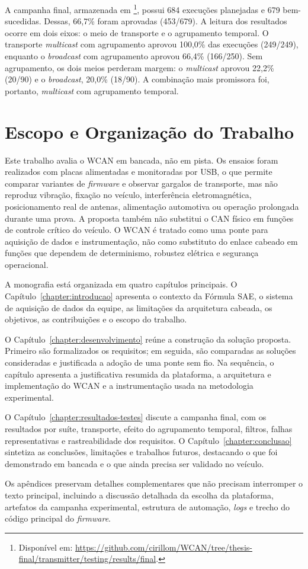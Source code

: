 A campanha final, armazenada em \footnote{Disponível em: \url{https://github.com/cirillom/WCAN/tree/thesis-final/transmitter/testing/results/final}.}, possui 684 execuções
planejadas e 679 bem-sucedidas. Dessas, 66,7\% foram aprovadas
(453/679). A leitura dos resultados ocorre em dois eixos: o meio de transporte
e o agrupamento temporal. O transporte \emph{multicast} com agrupamento aprovou 100,0\%
das execuções (249/249), enquanto o \emph{broadcast} com
agrupamento aprovou 66,4\% (166/250). Sem agrupamento, os dois meios perderam
margem: o \emph{multicast} aprovou 22,2\% (20/90) e o \emph{broadcast},
20,0\% (18/90). A combinação mais promissora foi, portanto, \emph{multicast}
com agrupamento temporal.

\section{Escopo e Organização do Trabalho}

Este trabalho avalia o WCAN em bancada, não em pista. Os ensaios foram realizados
com placas alimentadas e monitoradas por USB, o que permite comparar variantes de
\emph{firmware} e observar gargalos de transporte, mas não reproduz vibração, fixação no
veículo, interferência eletromagnética, posicionamento real de antenas,
alimentação automotiva ou operação prolongada durante uma prova. A proposta também
não substitui o CAN físico em funções de controle crítico do veículo. O WCAN é
tratado como uma ponte para aquisição de dados e instrumentação, não como
substituto do enlace cabeado em funções que dependem de determinismo, robustez
elétrica e segurança operacional.

A monografia está organizada em quatro capítulos principais. O
Capítulo~\ref{chapter:introducao} apresenta o contexto da Fórmula SAE, o sistema
de aquisição de dados da equipe, as limitações da arquitetura cabeada, os
objetivos, as contribuições e o escopo do trabalho.

O Capítulo~\ref{chapter:desenvolvimento} reúne a construção da solução proposta.
Primeiro são formalizados os requisitos; em seguida, são comparadas as soluções
consideradas e justificada a adoção de uma ponte sem fio. Na sequência, o
capítulo apresenta a justificativa resumida da plataforma, a arquitetura e
implementação do WCAN e a instrumentação usada na metodologia experimental.

O Capítulo~\ref{chapter:resultados-testes} discute a campanha final, com os
resultados por suíte, transporte, efeito do agrupamento temporal, filtros, falhas
representativas e rastreabilidade dos requisitos. O
Capítulo~\ref{chapter:conclusao} sintetiza as conclusões, limitações e trabalhos
futuros, destacando o que foi demonstrado em bancada e o que ainda precisa ser
validado no veículo.

Os apêndices preservam detalhes complementares que não precisam interromper o
texto principal, incluindo a discussão detalhada da escolha da plataforma,
artefatos da campanha experimental, estrutura de automação, \emph{logs} e trecho
do código principal do \emph{firmware}.
